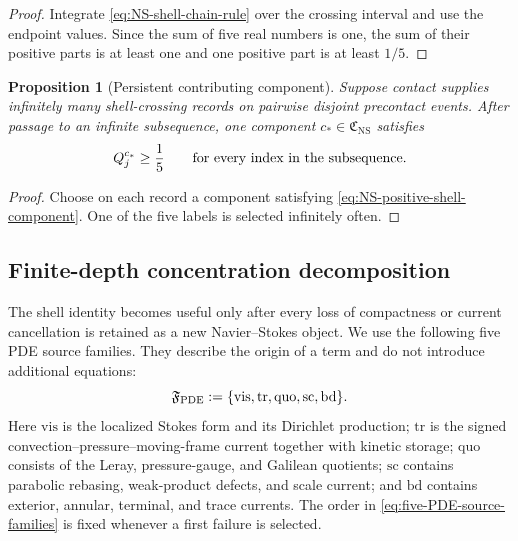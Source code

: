 \documentclass[11pt]{amsart}
\numberwithin{equation}{section}
\theoremstyle{plain}
\newtheorem{proposition}[proposition]{Proposition}
\theoremstyle{definition}
\theoremstyle{remark}
\begin{document}
\begin{proof}
Integrate \eqref{eq:NS-shell-chain-rule} over the crossing interval and use
the endpoint values.  Since the sum of five real numbers is one, the sum of
their positive parts is at least one and one positive part is at least
\(1/5\).
\end{proof}

\begin{proposition}[Persistent contributing component]
\label{prop:persistent-NS-component}
Suppose contact supplies infinitely many shell-crossing records on pairwise
disjoint precontact events.  After passage to an infinite subsequence, one
component \(c_*\in\mathfrak C_{\mathrm{NS}}\) satisfies
\begin{equation}\label{eq:persistent-NS-component}
 Q^{c_*}_j\ge\frac15
 \qquad\hbox{for every index in the subsequence}.
\end{equation}
\end{proposition}

\begin{proof}
Choose on each record a component satisfying
\eqref{eq:NS-positive-shell-component}.  One of the five labels is selected
infinitely often.
\end{proof}

\subsection{Finite-depth concentration decomposition}
\label{sec:finite-depth-PDE-decomposition}

The shell identity becomes useful only after every loss of compactness or
current cancellation is retained as a new Navier--Stokes object.  We use the
following five PDE source families.  They describe the origin of a term and
do not introduce additional equations:
\begin{equation}\label{eq:five-PDE-source-families}
 \mathfrak F_{\rm PDE}
 :=\{\mathrm{vis},\mathrm{tr},\mathrm{quo},
       \mathrm{sc},\mathrm{bd}\}.
\end{equation}
Here \(\mathrm{vis}\) is the localized Stokes form and its Dirichlet
production; \(\mathrm{tr}\) is the signed convection--pressure--moving-frame
current together with kinetic storage; \(\mathrm{quo}\) consists of the
Leray, pressure-gauge, and Galilean quotients; \(\mathrm{sc}\) contains
parabolic rebasing, weak-product defects, and scale current; and
\(\mathrm{bd}\) contains exterior, annular, terminal, and trace currents.
The order in \eqref{eq:five-PDE-source-families} is fixed whenever a first
failure is selected.
\end{document}
